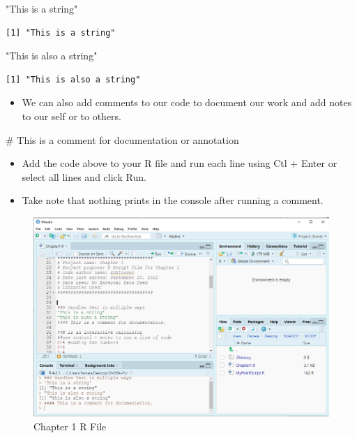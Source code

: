 \documentclass[
  letterpaper,
  DIV=11,
  numbers=noendperiod]{scrreprt}
\newenvironment{Shaded}{\begin{snugshade}}{\end{snugshade}}
\newcommand{\CommentTok}[1]{\textcolor[rgb]{0.37,0.37,0.37}{#1}}
\newcommand{\StringTok}[1]{\textcolor[rgb]{0.13,0.47,0.30}{#1}}
\providecommand{\tightlist}{%
  \setlength{\itemsep}{0pt}\setlength{\parskip}{0pt}}\usepackage{longtable,booktabs,array}
\begin{document}
\begin{Shaded}
\begin{Highlighting}[]
\StringTok{"This is a string"}
\end{Highlighting}
\end{Shaded}

\begin{verbatim}
[1] "This is a string"
\end{verbatim}

\begin{Shaded}
\begin{Highlighting}[]
\StringTok{"This is also a string"}
\end{Highlighting}
\end{Shaded}

\begin{verbatim}
[1] "This is also a string"
\end{verbatim}

\begin{itemize}
\tightlist
\item
  We can also add comments to our code to document our work and add
  notes to our self or to others.
\end{itemize}

\begin{Shaded}
\begin{Highlighting}[]
\CommentTok{\# This is a comment for documentation or annotation}
\end{Highlighting}
\end{Shaded}

\begin{itemize}
\tightlist
\item
  Add the code above to your R file and run each line using Ctl + Enter
  or select all lines and click Run.
\item
  Take note that nothing prints in the console after running a comment.
\end{itemize}

\begin{figure}[H]

{\centering \includegraphics{Pictures/Ch1/Chapter1Start.png}

}

\caption{Chapter 1 R File}

\end{figure}%
\end{document}
